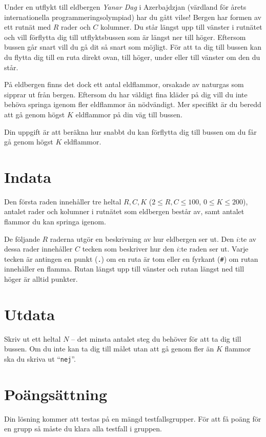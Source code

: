 Under en utflykt till eldbergen \emph{Yanar Dag} i Azerbajdzjan (värdland för årets internationella programmeringsolympiad) har du gått vilse!
Bergen har formen av ett rutnät med $R$ rader och $C$ kolumner.
Du står längst upp till vänster i rutnätet och vill förflytta dig till utflyktsbussen som är längst ner till höger.
Eftersom bussen går snart vill du gå dit så snart som möjligt.
För att ta dig till bussen kan du flytta dig till en ruta direkt ovan, till höger, under eller till vänster om den du står.

På eldbergen finns det dock ett antal eldflammor, orsakade av naturgas som sipprar ut från bergen.
Eftersom du har väldigt fina kläder på dig vill du inte behöva springa igenom fler eldflammor än nödvändigt.
Mer specifikt är du beredd att gå genom högst $K$ eldflammor på din väg till bussen.

Din uppgift är att beräkna hur snabbt du kan förflytta dig till bussen om du får gå genom högst $K$ eldflammor.

\section*{Indata}
Den första raden innehåller tre heltal $R, C, K$ ($2 \le R, C \le 100$, $0 \le K \le 200$), antalet rader och kolumner i rutnätet som eldbergen består av, samt antalet flammor du kan springa igenom.

De följande $R$ raderna utgör en beskrivning av hur eldbergen ser ut.
Den $i$:te av dessa rader innehåller $C$ tecken som beskriver hur den $i$:te raden ser ut.
Varje tecken är antingen en punkt (\texttt{.}) om en ruta är tom eller en fyrkant (\texttt{\#}) om rutan innehåller en flamma. Rutan längst upp till vänster och rutan längst ned till höger är alltid punkter.

\section*{Utdata}
Skriv ut ett heltal $N$ -- det minsta antalet steg du behöver för att ta dig till bussen.
Om du inte kan ta dig till målet utan att gå genom fler än $K$ flammor ska du skriva ut ``\texttt{nej}''.

\section*{Poängsättning}
Din lösning kommer att testas på en mängd testfallsgrupper.
För att få poäng för en grupp så måste du klara alla testfall i gruppen.


